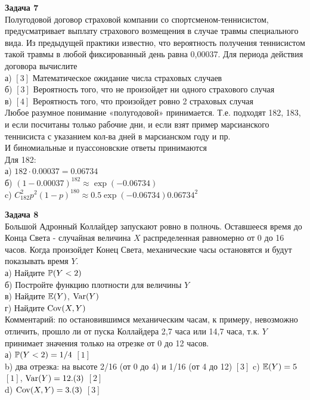 \documentclass[12pt, a4paper]{article}\usepackage[]{graphicx}\usepackage[]{color}
\begin{document}
	\textbf{Задача 7} \\ %
	Полугодовой договор страховой компании со спортсменом-теннисистом, предусматривает выплату страхового возмещения  в случае травмы специального вида. Из предыдущей практики известно, что вероятность получения теннисистом такой травмы  в любой фиксированный день равна 0,00037. Для периода действия договора вычислите \\
	а) $[3]$ Математическое ожидание числа страховых случаев \\
	б) $[3]$ Вероятность того, что не произойдет ни одного страхового случая \\
	в) $[4]$ Вероятность того, что произойдет ровно 2 страховых случая \\
	Любое разумное понимание «полугодовой» принимается. Т.е. подходят 182, 183, и если посчитаны только рабочие дни, и если взят пример марсианского теннисиста с указанием кол-ва дней в марсианском году и пр. \\
	И биномиальные и пуассоновские ответы принимаются \\
	Для 182: \\
	а) $182\cdot 0.00037=0.06734$  \\
	б) $(1-0.00037)^182\approx \exp(-0.06734)$ \\
	c) $C_{182}^{2}p^{2}(1-p)^{180}\approx 0.5\exp(-0.06734)0.06734^2$



	\textbf{Задача 8} \\
	Большой Адронный Коллайдер запускают ровно в полночь. Оставшееся время до Конца Света - случайная величина $X$ распределенная равномерно от 0 до 16 часов. Когда произойдет Конец Света, механические часы остановятся и будут показывать время $Y$. \\
	а) Найдите $\P(Y<2)$ \\
	б) Постройте функцию плотности для величины $Y$ \\
	в) Найдите $\E(Y)$, $\Var(Y)$\\
	г) Найдите $\Cov(X,Y)$ \\
	Комментарий: по остановившимся механическим часам, к примеру, невозможно отличить, прошло ли от пуска Коллайдера 2,7 часа или 14,7 часа, т.к. $Y$ принимает значения только на отрезке от 0 до 12 часов. \\
	а) $\P(Y<2)=1/4$ $[1]$ \\
	b) два отрезка: на высоте 2/16 (от 0 до 4) и 1/16 (от 4 до 12) $[3]$
	c) $\E(Y)=5$ $[1]$, $\Var(Y)=12.(3)$ $[2]$ \\
	d) $\Cov(X,Y)=3.(3)$ $[3]$ \\
\end{document}
